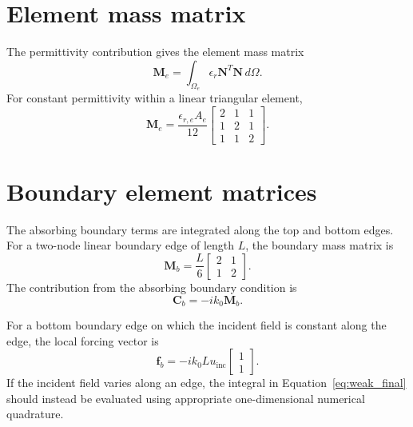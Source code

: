 \documentclass{article}
\begin{document}
\section{Element mass matrix}

The permittivity contribution gives the element mass matrix
\begin{equation}
    \mathbf{M}_e=
    \int_{\Omega_e}
    \epsilon_r\mathbf{N}^T\mathbf{N}\,d\Omega.
    \label{eq:element_mass_integral}
\end{equation}
For constant permittivity within a linear triangular element,
\begin{equation}
    \boxed{
    \mathbf{M}_e=
    \frac{\epsilon_{r,e}A_e}{12}
    \begin{bmatrix}
        2&1&1\\
        1&2&1\\
        1&1&2
    \end{bmatrix}.
    }
    \label{eq:element_mass}
\end{equation}

\section{Boundary element matrices}

The absorbing boundary terms are integrated along the top and bottom
edges. For a two-node linear boundary edge of length $L$, the boundary
mass matrix is
\begin{equation}
    \mathbf{M}_b=
    \frac{L}{6}
    \begin{bmatrix}
        2&1\\
        1&2
    \end{bmatrix}.
    \label{eq:boundary_mass}
\end{equation}
The contribution from the absorbing boundary condition is
\begin{equation}
    \boxed{\mathbf{C}_b=-ik_0\mathbf{M}_b.}
    \label{eq:boundary_matrix}
\end{equation}

For a bottom boundary edge on which the incident field is constant
along the edge, the local forcing vector is
\begin{equation}
    \boxed{
    \mathbf{f}_b=
    -ik_0L u_{\mathrm{inc}}
    \begin{bmatrix}1\\1\end{bmatrix}.
    }
    \label{eq:boundary_force}
\end{equation}
If the incident field varies along an edge, the integral in
Equation~\eqref{eq:weak_final} should instead be evaluated using
appropriate one-dimensional numerical quadrature.
\end{document}
